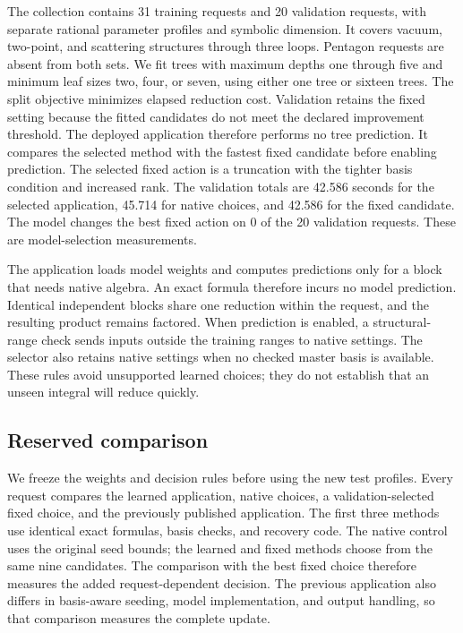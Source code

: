 The collection contains 31 training requests and 20 validation requests, with separate rational parameter profiles and symbolic dimension. It covers vacuum, two-point, and scattering structures through three loops. Pentagon requests are absent from both sets. We fit trees with maximum depths one through five and minimum leaf sizes two, four, or seven, using either one tree or sixteen trees. The split objective minimizes elapsed reduction cost. Validation retains the fixed setting because the fitted candidates do not meet the declared improvement threshold. The deployed application therefore performs no tree prediction. It compares the selected method with the fastest fixed candidate before enabling prediction. The selected fixed action is a truncation with the tighter basis condition and increased rank. The validation totals are 42.586 seconds for the selected application, 45.714 for native choices, and 42.586 for the fixed candidate. The model changes the best fixed action on 0 of the 20 validation requests. These are model-selection measurements.

The application loads model weights and computes predictions only for a block that needs native algebra. An exact formula therefore incurs no model prediction. Identical independent blocks share one reduction within the request, and the resulting product remains factored. When prediction is enabled, a structural-range check sends inputs outside the training ranges to native settings. The selector also retains native settings when no checked master basis is available. These rules avoid unsupported learned choices; they do not establish that an unseen integral will reduce quickly.

\subsection{Reserved comparison}
We freeze the weights and decision rules before using the new test profiles. Every request compares the learned application, native choices, a validation-selected fixed choice, and the previously published application. The first three methods use identical exact formulas, basis checks, and recovery code. The native control uses the original seed bounds; the learned and fixed methods choose from the same nine candidates. The comparison with the best fixed choice therefore measures the added request-dependent decision. The previous application also differs in basis-aware seeding, model implementation, and output handling, so that comparison measures the complete update.

